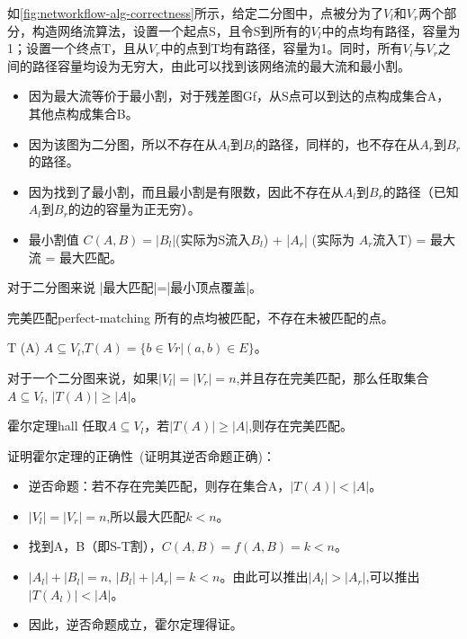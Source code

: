 \begin{example}
	如\autoref{fig:networkflow-alg-correctness}所示，给定二分图中，点被分为了\(V_l\)和\(V_r\)两个部分，构造网络流算法，设置一个起点S，且令S到所有的\(V_l\)中的点均有路径，容量为1；设置一个终点T，且从\(V_r\)中的点到T均有路径，容量为1。同时，所有\(V_l\)与\(V_r\)之间的路径容量均设为无穷大，由此可以找到该网络流的最大流和最小割。
\end{example}

\begin{itemize}
	\item 因为最大流等价于最小割，对于残差图Gf，从S点可以到达的点构成集合A，其他点构成集合B。
	\item 因为该图为二分图，所以不存在从\(A_l\)到\(B_l\)的路径，同样的，也不存在从\(A_r\)到\(B_r\)的路径。
	\item 因为找到了最小割，而且最小割是有限数，因此不存在从\(A_l\)到\(B_r\)的路径（已知\(A_l\)到\(B_r\)的边的容量为正无穷）。
	\item 最小割值 \(C(A,B) =|B_l|\)(实际为S流入\(B_l\)) + |\(A_r\)| (实际为 \(A_r\)流入T) = 最大流 = 最大匹配。
\end{itemize}
对于二分图来说 |最大匹配|=|最小顶点覆盖|。

\begin{definition}{完美匹配}{perfect-matching}
	所有的点均被匹配，不存在未被匹配的点。
\end{definition}

\begin{definition}{T (A)}{}
	\(A \subseteq V_l\),\(T(A) = \{b \in Vr | (a,b) \in E \} \)。
\end{definition}

对于一个二分图来说，如果\(|V_l|=|V_r|=n\),并且存在完美匹配，那么任取集合\(A \subseteq V_l,\,|T(A)| \ge |A|\)。

\begin{theorem}{霍尔定理}{hall}
	任取\(A \subseteq V_l\)，若\(|T(A)| \ge |A|\),则存在完美匹配。
\end{theorem}
证明霍尔定理的正确性~(证明其逆否命题正确)：
\begin{itemize}
	\item 逆否命题：若不存在完美匹配，则存在集合A，\(|T(A)| < |A|\)。
	\item \(|V_l|=|V_r|=n\),所以最大匹配\(k<n\)。
	\item 找到A，B（即S-T割），\(C(A,B) = f(A,B) = k<n\)。
	\item \(|A_l|+|B_l| = n,\,|B_l|+|A_r| = k < n\)。由此可以推出\(|A_l| > |A_r|\),可以推出\(|T(A_l)| < |A|\)。
	\item 因此，逆否命题成立，霍尔定理得证。
\end{itemize}

